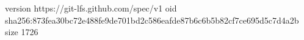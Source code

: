 version https://git-lfs.github.com/spec/v1
oid sha256:873fea30bc72e488fe9de701bd2c586eafde87b6c6b5b82cf7ce695d5c7d4a2b
size 1726
